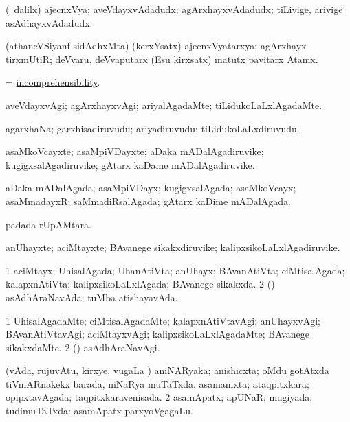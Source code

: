 \bentry
{}
\gl{\nA}
\bmng
(\kanmu\ \bava dalilx) ajecnxVya; aveVdayxvAdadudx; agArxhayxvAdadudx; tiLivige, arivige asAdhayxvAdadudx. 
\emng

\noindent
\gl{\pagu}
\bmng
{} (athaneVSiyanf sidAdhxMta) (kerxYsatx) ajecnxVyatarxya; agArxhayx tirxmUtiR; deVvaru, deVvaputarx (Esu kirxsatx) matutx pavitarx Atamx. 
\emng
\eentry

\bentry
{}
\gl{\nA}
\bmng
 = \hyperlink{incomprehensibility}{incomprehensibility}. 
\emng
\eentry

\bentry
{}
\gl{\kirxvi}
\bmng
aveVdayxvAgi; agArxhayxvAgi; ariyalAgadaMte; tiLidukoLaLxlAgadaMte. 
\emng
\eentry

\bentry
{}
\gl{\nA}
\bmng
agarxhaNa; garxhisadiruvudu; ariyadiruvudu; tiLidukoLaLxdiruvudu. 
\emng
\eentry

\bentry
{}
\gl{\nA}
\bmng
asaMkoVcayxte; asaMpiVDayxte; aDaka mADalAgadiruvike; kugigxsalAgadiruvike; gAtarx kaDame mADalAgadiruvike. 
\emng
\eentry

\bentry
{}
\gl{\gu}
\bmng
aDaka mADalAgada; asaMpiVDayx; kugigxsalAgada; asaMkoVcayx; asaMmadayxR; saMmadiRsalAgada; gAtarx kaDime mADalAgada. 
\emng
\eentry

\bentry
{}
\gl{\gu}
\bmng
{} padada rUpAMtara. 
\emng
\eentry

\bentry
{}
\gl{\nA}
\bmng
anUhayxte; aciMtayxte; BAvanege sikakxdiruvike; kalipxsikoLaLxlAgadiruvike. 
\emng
\eentry

\bentry
{}
\gl{\gu}
\bmng
\bnum
\num{1} aciMtayx; UhisalAgada; UhanAtiVta; anUhayx; BAvanAtiVta; ciMtisalAgada; kalapxnAtiVta; kalipxsikoLaLxlAgada; BAvanege sikakxda. 
\num{2} (\AmA) asAdhAraNavAda; tuMba atishayavAda. 
\enum
\emng
\eentry

\bentry
{}
\gl{\kirxvi}
\bmng
\bnum
\num{1} UhisalAgadaMte; ciMtisalAgadaMte; kalapxnAtiVtavAgi; anUhayxvAgi; BAvanAtiVtavAgi; aciMtayxvAgi; kalipxsikoLaLxlAgadaMte; BAvanege sikakxdaMte. 
\num{2} (\AmA) asAdhAraNavAgi. 
\enum
\emng
\eentry

\bentry
{}
\gl{\gu}
\bmng
\bnum
{} (vAda, rujuvAtu, kirxye, \mo vugaLa \vi) 
\banum
{} aniNARyaka; anishicxta; oMdu gotAtxda tiVmARnakekx barada, niNaRya muTaTxda. 
 asamamxta; ataqpitxkara; opipxtavAgada; taqpitxkaravenisada. 
\eanum
\numie
\num{2} asamApatx; apUNaR; mugiyada; tudimuTaTxda:  asamApatx parxyoVgagaLu. 
\enum
\emng
\eentry

